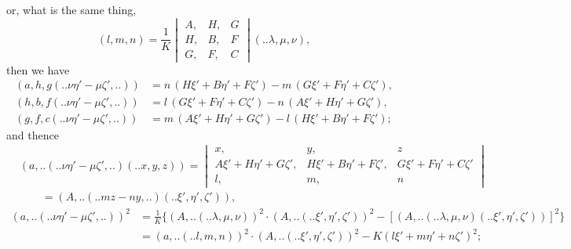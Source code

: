 \documentclass[12pt,a4paper]{article}
\newcommand{\qform}[2]{(#1 \mathbin{..} #2)}
\theoremstyle{definition}
\begin{document}
or, what is the same thing,
\[
(l, m, n) = \frac{1}{K}
\begin{vmatrix}
A, & H, & G \\
H, & B, & F \\
G, & F, & C
\end{vmatrix}
\!\qform{}{\lambda, \mu, \nu},
\]
then we have
\begin{align*}
(a, h, g \!\qform{}{\nu\eta' - \mu\zeta',..}) &= n\,(H\xi' + B\eta' + F\zeta') - m\,(G\xi' + F\eta' + C\zeta'),\\
(h, b, f \!\qform{}{\nu\eta' - \mu\zeta',..}) &= l\,(G\xi' + F\eta' + C\zeta') - n\,(A\xi' + H\eta' + G\zeta'),\\
(g, f, c \!\qform{}{\nu\eta' - \mu\zeta',..}) &= m\,(A\xi' + H\eta' + G\zeta') - l\,(H\xi' + B\eta' + F\zeta');
\end{align*}
and thence
\begin{align*}
&(a,..\!\qform{}{\nu\eta' - \mu\zeta',..}\!\qform{}{x, y, z}) =
\begin{vmatrix}
x, & y, & z \\
A\xi' + H\eta' + G\zeta', & H\xi' + B\eta' + F\zeta', & G\xi' + F\eta' + C\zeta' \\
l, & m, & n
\end{vmatrix}\\
&\qquad = (A,..\!\qform{}{mz - ny,..}\!\qform{}{\xi', \eta', \zeta'}),
\end{align*}
\begin{align*}
(a,..\!\qform{}{\nu\eta' - \mu\zeta',..})^{2}
&= \frac{1}{K}\Big\{(A,..\!\qform{}{\lambda, \mu, \nu})^{2} \cdot (A,..\!\qform{}{\xi', \eta', \zeta'})^{2}
- [(A,..\!\qform{}{\lambda, \mu, \nu}\!\qform{}{\xi', \eta', \zeta'})]^{2}\Big\}\\
&= (a,..\!\qform{}{l, m, n})^{2} \cdot (A,..\!\qform{}{\xi', \eta', \zeta'})^{2} - K(l\xi' + m\eta' + n\zeta')^{2};
\end{align*}
\end{document}
